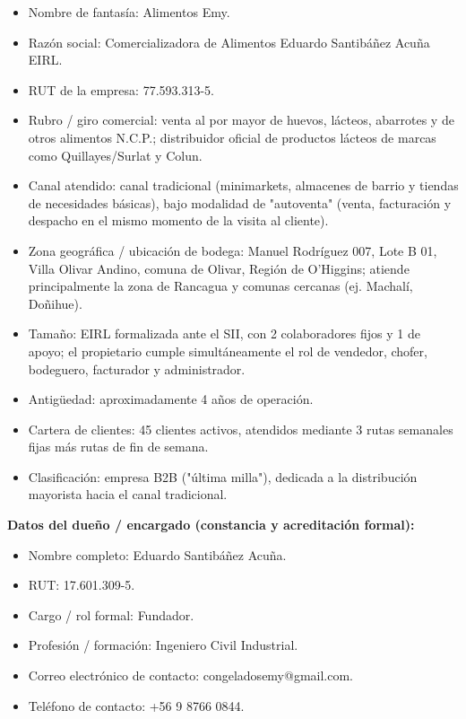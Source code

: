 \documentclass[10pt,a4paper]{article}
\begin{document}
\begin{itemize}[leftmargin=1.2cm]
    \item Nombre de fantasía: Alimentos Emy.
    \item Razón social: Comercializadora de Alimentos Eduardo Santibáñez Acuña EIRL.
    \item RUT de la empresa: 77.593.313-5.
    \item Rubro / giro comercial: venta al por mayor de huevos, lácteos, abarrotes y de otros alimentos N.C.P.; distribuidor oficial de productos lácteos de marcas como Quillayes/Surlat y Colun.
    \item Canal atendido: canal tradicional (minimarkets, almacenes de barrio y tiendas de necesidades básicas), bajo modalidad de "autoventa" (venta, facturación y despacho en el mismo momento de la visita al cliente).
    \item Zona geográfica / ubicación de bodega: Manuel Rodríguez 007, Lote B 01, Villa Olivar Andino, comuna de Olivar, Región de O'Higgins; atiende principalmente la zona de Rancagua y comunas cercanas (ej. Machalí, Doñihue).
    \item Tamaño: EIRL formalizada ante el SII, con 2 colaboradores fijos y 1 de apoyo; el propietario cumple simultáneamente el rol de vendedor, chofer, bodeguero, facturador y administrador.
    \item Antigüedad: aproximadamente 4 años de operación.
    \item Cartera de clientes: 45 clientes activos, atendidos mediante 3 rutas semanales fijas más rutas de fin de semana.
    \item Clasificación: empresa B2B ("última milla"), dedicada a la distribución mayorista hacia el canal tradicional.
\end{itemize}

\textbf{Datos del dueño / encargado (constancia y acreditación formal):}

\begin{itemize}[leftmargin=1.2cm]
    \item Nombre completo: Eduardo Santibáñez Acuña.
    \item RUT: 17.601.309-5.
    \item Cargo / rol formal: Fundador.
    \item Profesión / formación: Ingeniero Civil Industrial.
    \item Correo electrónico de contacto: congeladosemy@gmail.com.
    \item Teléfono de contacto: +56 9 8766 0844.
\end{itemize}
\end{document}
